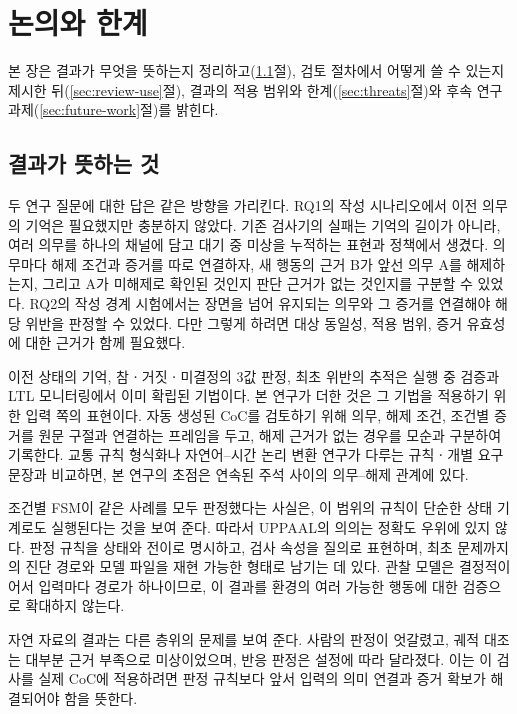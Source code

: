 \section{논의와 한계}
\label{sec:discussion}

\begin{revision}

본 장은 결과가 무엇을 뜻하는지 정리하고(\ref{sec:discussion-results}절), 검토 절차에서 어떻게 쓸 수 있는지 제시한 뒤(\ref{sec:review-use}절), 결과의 적용 범위와 한계(\ref{sec:threats}절)와 후속 연구 과제(\ref{sec:future-work}절)를 밝힌다.

\subsection{결과가 뜻하는 것}
\label{sec:discussion-results}
두 연구 질문에 대한 답은 같은 방향을 가리킨다. RQ1의 작성 시나리오에서 이전 의무의 기억은 필요했지만 충분하지 않았다. 기존 검사기의 실패는 기억의 길이가 아니라, 여러 의무를 하나의 채널에 담고 대기 중 미상을 누적하는 표현과 정책에서 생겼다. 의무마다 해제 조건과 증거를 따로 연결하자, 새 행동의 근거 B가 앞선 의무 A를 해제하는지, 그리고 A가 미해제로 확인된 것인지 판단 근거가 없는 것인지를 구분할 수 있었다. RQ2의 작성 경계 시험에서는 장면을 넘어 유지되는 의무와 그 증거를 연결해야 해당 위반을 판정할 수 있었다. 다만 그렇게 하려면 대상 동일성, 적용 범위, 증거 유효성에 대한 근거가 함께 필요했다.

이전 상태의 기억, 참ㆍ거짓ㆍ미결정의 3값 판정, 최초 위반의 추적은 실행 중 검증과 LTL 모니터링에서 이미 확립된 기법이다\cite{leucker2009runtime,bauer2011runtime}. 본 연구가 더한 것은 그 기법을 적용하기 위한 입력 쪽의 표현이다. 자동 생성된 CoC를 검토하기 위해 의무, 해제 조건, 조건별 증거를 원문 구절과 연결하는 프레임을 두고, 해제 근거가 없는 경우를 모순과 구분하여 기록한다. 교통 규칙 형식화나 자연어--시간 논리 변환 연구가 다루는 규칙ㆍ개별 요구 문장과 비교하면, 본 연구의 초점은 연속된 주석 사이의 의무--해제 관계에 있다.

조건별 FSM이 같은 사례를 모두 판정했다는 사실은, 이 범위의 규칙이 단순한 상태 기계로도 실행된다는 것을 보여 준다. 따라서 UPPAAL의 의의는 정확도 우위에 있지 않다. 판정 규칙을 상태와 전이로 명시하고, 검사 속성을 질의로 표현하며, 최초 문제까지의 진단 경로와 모델 파일을 재현 가능한 형태로 남기는 데 있다. 관찰 모델은 결정적이어서 입력마다 경로가 하나이므로, 이 결과를 환경의 여러 가능한 행동에 대한 검증으로 확대하지 않는다.

자연 자료의 결과는 다른 층위의 문제를 보여 준다. 사람의 판정이 엇갈렸고, 궤적 대조는 대부분 근거 부족으로 미상이었으며, 반응 판정은 설정에 따라 달라졌다. 이는 이 검사를 실제 CoC에 적용하려면 판정 규칙보다 앞서 입력의 의미 연결과 증거 확보가 해결되어야 함을 뜻한다.


\end{revision}

